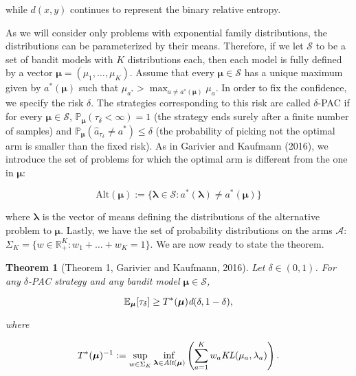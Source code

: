 \documentclass[12pt,]{article}
\newtheorem{theorem}{Theorem}
\begin{document}
while \(d(x,y)\) continues to represent the binary relative entropy.

As we will consider only problems with exponential family distributions,
the distributions can be parameterized by their means. Therefore, if we
let \(\mathcal{S}\) to be a set of bandit models with \(K\)
distributions each, then each model is fully defined by a vector
\(\bm{\mu} = (\mu_1, \dots, \mu_K)\). Assume that every
\(\bm{\mu} \in \mathcal{S}\) has a unique maximum given by
\(a^*(\bm{\mu})\) such that
\(\mu_{a^*} > \max_{a \neq a^*(\bm{\mu})} \mu_a\). In order to fix the
confidence, we specify the risk \(\delta\). The strategies corresponding
to this risk are called \(\delta\)-PAC if for every
\(\bm{\mu} \in \mathcal{S}\),
\(\mathbb{P}_{\bm{\mu}}(\tau_{\delta} < \infty) = 1\) (the strategy ends
surely after a finite number of samples) and
\(\mathbb{P}_{\bm{\mu}}(\hat{a}_{\tau_{\delta}} \neq a^*) \leq \delta\)
(the probability of picking not the optimal arm is smaller than the
fixed risk). As in Garivier and Kaufmann (2016), we introduce the set of
problems for which the optimal arm is different from the one in
\(\bm{\mu}\):

\begin{equation*}
\text{Alt}(\bm{\mu}) := \{\bm{\lambda} \in \mathcal{S}: a^*(\bm{\lambda}) \neq a^*(\bm{\mu})\}
\end{equation*}

where \(\bm{\lambda}\) is the vector of means defining the distributions
of the alternative problem to \(\bm{\mu}\). Lastly, we have the set of
probability distributions on the arms \(\mathcal{A}\):
\(\Sigma_K = \{w \in \mathbb{R}_{+}^K: w_1 + \dots + w_K = 1\}\).
We are now ready to state the theorem.

\begin{theorem}[Theorem 1, Garivier and Kaufmann, 2016] \label{theorem:GarivierKaufmannTheorem1}
Let $\delta \in (0,1)$. For any $\delta$-PAC strategy and any bandit model $\bm{\mu} \in \mathcal{S}$,

\begin{equation*}
\mathbb{E}_{\bm{\mu}} [\tau_{\delta}] \geq T^*(\bm{\mu}) \text{\em{d}}(\delta,1-\delta),
\end{equation*}

where 

\begin{equation} \label{eq:GarivierKaufmann_Theorem1_Game}
T^*(\bm{\mu})^{-1} := \sup_{w \in \Sigma_K} \inf_{\bm{\lambda} \in \text{\em{Alt}}(\bm{\mu})} \left( \sum_{a=1}^K w_a \text{\em{KL}}(\mu_a, \lambda_a)\right).
\end{equation}
\end{theorem}
\end{document}
